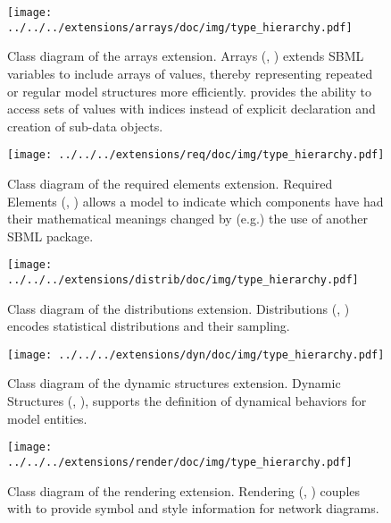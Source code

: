 \begin{figure}[H]
 \centering
\texttt{[image: ../../../extensions/arrays/doc/img/type\_hierarchy.pdf]}
 \vspace*{-4em}
 \caption[Class diagram of the arrays extension]{Class diagram of the arrays extension. Arrays (, \cite{Watanabe2013}) extends SBML variables to include arrays of values,
thereby representing repeated or regular model structures more efficiently.
 provides the ability to access sets of values with indices instead of explicit
declaration and creation of sub-data objects.}
 \label{fig:arrays}
\end{figure}


\begin{figure}[H]
 \centering
\texttt{[image: ../../../extensions/req/doc/img/type\_hierarchy.pdf]}
 \vspace*{-3em}
 \caption[Class diagram of the required elements extension]{Class diagram of the required elements extension. Required Elements (, \cite{Smith2013}) allows a model to indicate which
components have had their mathematical meanings changed by (e.g.) the use of
another SBML package.}
 \label{fig:arrays}
\end{figure}


\begin{figure}[H]
 \centering
\texttt{[image: ../../../extensions/distrib/doc/img/type\_hierarchy.pdf]}
 \vspace*{-3em}
 \caption[Class diagram of the distributions extension.]{ Class diagram of the distributions extension. Distributions 
 (, \cite{Moodie2013}) encodes statistical distributions and their sampling.}
 \label{fig:distrib}
\end{figure}


\begin{figure}[H]
 \vspace*{-2em}
 \centering
\texttt{[image: ../../../extensions/dyn/doc/img/type\_hierarchy.pdf]}
 \vspace*{-4em}
 \caption[Class diagram of the dynamic structures extension]{Class diagram of the dynamic structures extension. Dynamic Structures (, \cite{Gomez2014}), supports the definition of dynamical behaviors for model entities.
}
 \label{fig:dyn}
\end{figure}


\begin{figure}[H]
 \vspace*{-3em}
 \centering
\texttt{[image: ../../../extensions/render/doc/img/type\_hierarchy.pdf]}
 \vspace*{-3em}
 \caption[Class diagram of the rendering extension.]{Class diagram of the rendering extension. Rendering (, \cite{gauges2006}) couples with \cite{Layout} to provide symbol and style information for network diagrams.}
 \label{fig:render}
\end{figure}

